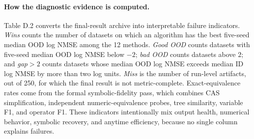 \paragraph{How the diagnostic evidence is computed.}
Table D.2 converts the final-result archive into interpretable failure indicators. \emph{Wins} counts the number of datasets on which an algorithm has the best five-seed median OOD log NMSE among the 12 methods. \emph{Good OOD} counts datasets with five-seed median OOD log NMSE below $-2$; \emph{bad OOD} counts datasets above $2$; and \emph{gap$>2$} counts datasets whose median OOD log NMSE exceeds median ID log NMSE by more than two log units. \emph{Miss} is the number of run-level artifacts, out of 250, for which the final result is not metric-complete. Exact-equivalence rates come from the formal symbolic-fidelity pass, which combines CAS simplification, independent numeric-equivalence probes, tree similarity, variable F1, and operator F1. These indicators intentionally mix output health, numerical behavior, symbolic recovery, and anytime efficiency, because no single column explains failures.

